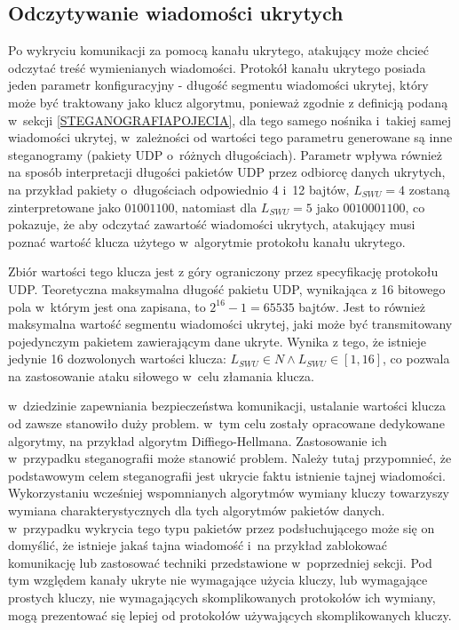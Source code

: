 \documentclass[a4paper, twoside, 12pt]{report}
\begin{document}
       \subsection{Odczytywanie wiadomości ukrytych}
       Po wykryciu komunikacji za pomocą kanału ukrytego, atakujący może chcieć
       odczytać treść wymienianych wiadomości. Protokół kanału ukrytego posiada
       jeden parametr konfiguracyjny - długość segmentu wiadomości ukrytej, który
       może być traktowany jako klucz algorytmu, ponieważ zgodnie z definicją podaną
       w~sekcji \ref{STEGANOGRAFIAPOJECIA}, dla tego samego nośnika i~takiej samej
       wiadomości ukrytej, w~zależności od wartości tego parametru generowane są
       inne steganogramy (pakiety UDP o~różnych długościach). Parametr wpływa również
       na sposób interpretacji długości pakietów UDP przez odbiorcę danych ukrytych,
       na przykład pakiety o~długościach odpowiednio 4 i~12 bajtów, \( L_{SWU} = 4 \)
       zostaną zinterpretowane jako \( 0100 1100 \), natomiast dla \( L_{SWU} = 5 \)
       jako \( 00100 01100 \), co pokazuje, że aby odczytać zawartość wiadomości
       ukrytych, atakujący musi poznać wartość klucza użytego w~algorytmie protokołu
       kanału ukrytego.

       Zbiór wartości tego
       klucza jest z góry ograniczony przez specyfikację protokołu UDP. Teoretyczna
       maksymalna długość pakietu UDP, wynikająca z 16 bitowego pola w~którym jest
       ona zapisana, to \(2^{16} - 1 = 65535\) bajtów. Jest to również maksymalna
       wartość segmentu wiadomości ukrytej, jaki może być transmitowany pojedynczym
       pakietem zawierającym dane ukryte. Wynika z tego, że istnieje jedynie 16
       dozwolonych wartości klucza: \( L_{SWU} \in N \land L_{SWU} \in [1, 16] \),
       co pozwala na zastosowanie ataku siłowego w~celu złamania klucza.

       w~dziedzinie zapewniania bezpieczeństwa komunikacji, ustalanie wartości
       klucza od zawsze stanowiło duży problem. w~tym celu zostały opracowane
       dedykowane algorytmy, na przykład algorytm Diffiego-Hellmana. Zastosowanie
       ich w~przypadku steganografii może stanowić problem. Należy tutaj przypomnieć,
       że podstawowym celem steganografii jest ukrycie faktu istnienie tajnej wiadomości.
       Wykorzystaniu wcześniej wspomnianych algorytmów wymiany kluczy towarzyszy
       wymiana charakterystycznych dla tych algorytmów pakietów danych. w~przypadku
       wykrycia tego typu pakietów przez podsłuchującego może się on domyślić,
       że istnieje jakaś tajna wiadomość i~na przykład zablokować komunikację lub
       zastosować techniki przedstawione w~poprzedniej sekcji. Pod tym względem
       kanały ukryte nie wymagające użycia kluczy, lub wymagające prostych kluczy,
       nie wymagających skomplikowanych protokołów ich wymiany, mogą prezentować
       się lepiej od protokołów używających skomplikowanych kluczy.
\end{document}
